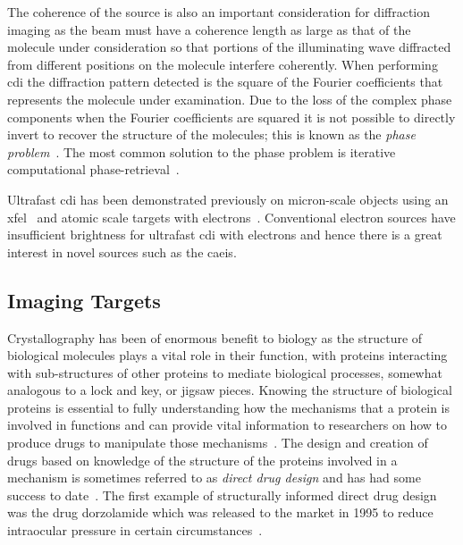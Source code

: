 The coherence of the source is also an important consideration for diffraction imaging as the beam must have a coherence length as large as that of the molecule under consideration so that portions of the illuminating wave diffracted from different positions on the molecule interfere coherently.
When performing \gls{cdi} the diffraction pattern detected is the square of the Fourier coefficients that represents the molecule under examination.
Due to the loss of the complex phase components when the Fourier coefficients are squared it is not possible to directly invert to recover the structure of the molecules; this is known as the \emph{phase problem}~\cite{rodenburg_phase_1989}.
The most common solution to the phase problem is iterative computational phase-retrieval~\cite{chapman_coherent_2010}.

Ultrafast \gls{cdi} has been demonstrated previously on micron-scale objects using an \gls{xfel}~\cite{chapman_femtosecond_2006} and atomic scale targets with electrons~\cite{putkunz_atom-scale_2012}.
Conventional electron sources have insufficient brightness for ultrafast \gls{cdi} with electrons and hence there is a great interest in novel sources such as the \gls{caeis}.

\subsection{Imaging Targets}

Crystallography has been of enormous benefit to biology as the structure of biological molecules plays a vital role in their function, with proteins interacting with sub-structures of other proteins to mediate biological processes, somewhat analogous to a lock and key, or jigsaw pieces.
Knowing the structure of biological proteins is essential to fully understanding how the mechanisms that a protein is involved in functions and can provide vital information to researchers on how to produce drugs to manipulate those mechanisms~\cite{aloy_structural_2006,almen_mapping_2009}.
The design and creation of drugs based on knowledge of the structure of the proteins involved in a mechanism is sometimes referred to as \emph{direct drug design} and has had some success to date~\cite{klebe_recent_2000,jhoti_structure-based_2007,mauser_recent_2008}.
The first example of structurally informed direct drug design was the drug dorzolamide which was released to the market in 1995 to reduce intraocular pressure in certain circumstances~\cite{greer_application_1994}.

